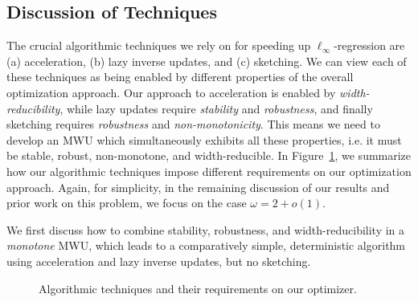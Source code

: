 \documentclass[11pt]{article}
\begin{document}
\subsection{Discussion of Techniques}
The crucial algorithmic techniques we rely on for speeding up $\ell_\infty$-regression are 
(a) acceleration, (b) lazy inverse updates, and (c) sketching.
We can view each of these techniques as being enabled by different properties of the overall optimization approach.
Our approach to acceleration is enabled by \emph{width-reducibility}, while lazy updates require \emph{stability} and \emph{robustness}, and finally sketching requires \emph{robustness} and \emph{non-monotonicity}.
This means we need to develop an MWU which simultaneously exhibits all these properties, i.e. it must be 
stable, robust, non-monotone, and width-reducible. 
In Figure~\ref{fig:techniquesAndRequirements}, we summarize how our algorithmic techniques impose different requirements on our optimization approach.
Again, for simplicity, in the remaining discussion of our results and prior work on this problem, we focus on the case $\omega = 2+o(1)$.

We first discuss how to combine stability, robustness, and width-reducibility in a \emph{monotone} MWU, which leads to a comparatively simple, deterministic algorithm using acceleration and lazy inverse updates, but no sketching.

\begin{figure}
    \centering
{}
\caption{Algorithmic techniques and their requirements on our optimizer.}
\label{fig:techniquesAndRequirements}
\end{figure}
\end{document}
